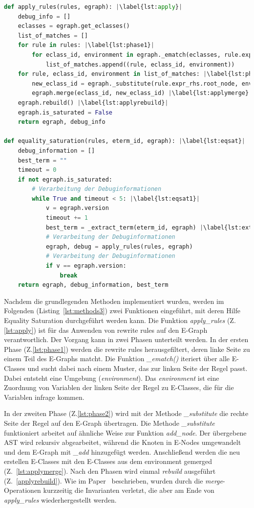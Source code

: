 \begin{lstlisting}[language=Python, escapechar=|, caption=Auszug aus der Klasse \textit{EGraph}, label={lst:methods3}]
def apply_rules(rules, egraph): |\label{lst:apply}|
    debug_info = []
    eclasses = egraph.get_eclasses()
    list_of_matches = []
    for rule in rules: |\label{lst:phase1}|
        for eclass_id, environment in egraph._ematch(eclasses, rule.expr_lhs.root_node):
            list_of_matches.append((rule, eclass_id, environment))
    for rule, eclass_id, environment in list_of_matches: |\label{lst:phase2}|
        new_eclass_id = egraph._substitute(rule.expr_rhs.root_node, environment)
        egraph.merge(eclass_id, new_eclass_id) |\label{lst:applymerge}|
    egraph.rebuild() |\label{lst:applyrebuild}|
    egraph.is_saturated = False
    return egraph, debug_info

def equality_saturation(rules, eterm_id, egraph): |\label{lst:eqsat}|
    debug_information = []
    best_term = ""
    timeout = 0
    if not egraph.is_saturated:
        # Verarbeitung der Debuginformationen
        while True and timeout < 5: |\label{lst:eqsat1}|
            v = egraph.version
            timeout += 1
            best_term = _extract_term(eterm_id, egraph) |\label{lst:extract}|
            # Verarbeitung der Debuginformationen
            egraph, debug = apply_rules(rules, egraph)
            # Verarbeitung der Debuginformationen
            if v == egraph.version:
                break
    return egraph, debug_information, best_term
\end{lstlisting} 

Nachdem die grundlegenden Methoden implementiert wurden, werden im Folgenden (Listing~\ref{lst:methods3}) zwei Funktionen eingeführt, mit deren Hilfe Equality Saturation durchgeführt werden kann.
Die Funktion \textit{apply\_rules} (Z.\ref{lst:apply}) ist für das Anwenden von rewrite rules auf den E-Graph verantwortlich. Der Vorgang kann in zwei Phasen unterteilt werden.
In der ersten Phase (Z.\ref{lst:phase1}) werden die rewrite rules herausgefiltert, deren linke Seite zu einem Teil des E-Graphs matcht. 
Die Funktion \textit{\_ematch()} iteriert über alle E-Classes und sucht dabei nach einem Muster, das zur linken Seite der Regel passt. Dabei entsteht eine Umgebung (\textit{environment}).
Das \textit{environment} ist eine Zuordnung von Variablen der linken Seite der Regel zu E-Classes, die für die Variablen infrage kommen. 

In der zweiten Phase (Z.\ref{lst:phase2})
wird mit der Methode \textit{\_substitute} die rechte Seite der Regel auf den E-Graph übertragen. Die Methode \textit{\_substitute} funktioniert arbeitet auf ähnliche Weise zur Funktion \textit{add\_node}.
Der übergebene AST wird rekursiv abgearbeitet, während die Knoten in E-Nodes umgewandelt und dem E-Graph mit \textit{\_add} hinzugefügt werden. Anschließend werden die neu erstellen E-Classes
mit den E-Classes aus dem environment gemerged (Z.~\ref{lst:applymerge}).
Nach den Phasen wird einmal \textit{rebuild} ausgeführt (Z.~\ref{applyrebuild}). Wie im Paper~\cite{2021-egg} beschrieben, wurden durch die \textit{merge}-Operationen kurzzeitig die Invarianten verletzt, 
die aber am Ende von \textit{apply\_rules} wiederhergestellt werden.

